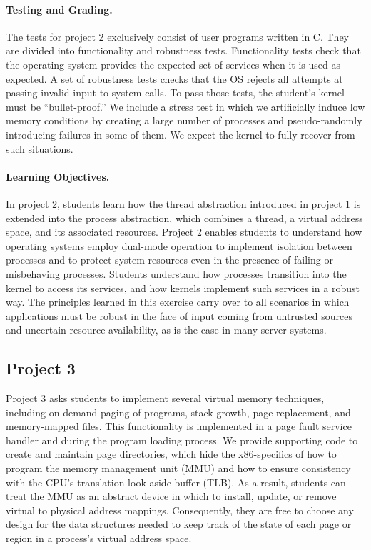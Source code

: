 \paragraph{Testing and Grading.}
The tests for project 2 exclusively consist of user programs written in C.
They are divided into functionality and robustness tests.  Functionality tests check that
the operating system provides the expected set of services when it is used as
expected.  A set of robustness tests checks that the OS rejects all attempts at passing
invalid input to system calls.  To pass those tests, the student's kernel must be 
``bullet-proof.'' We include a stress test in which we artificially induce low memory
conditions by creating a large number of processes and pseudo-randomly introducing
failures in some of them.  We expect the kernel to fully recover from such situations.

\paragraph{Learning Objectives.}
In project 2, students learn how the thread abstraction introduced in project 1 is 
extended into the process abstraction, which combines a thread, a virtual address space, 
and its associated resources.
Project 2 enables students to understand how operating systems employ dual-mode
operation to implement isolation between processes and to protect system resources
even in the presence of failing or misbehaving processes.  
Students understand how processes transition into the kernel to access its services,
and how kernels implement such services in a robust way.
The principles learned in this exercise carry over to all scenarios
in which applications must be robust in the face of input coming from untrusted 
sources and uncertain resource availability, as is the case in many server systems.

\subsection{Project 3}
Project 3 asks students to implement several virtual memory techniques, including
on-demand paging of programs, stack growth, page replacement, and memory-mapped files.
This functionality is implemented in a page fault service handler and during the
program loading process.
We provide supporting code to create and maintain page directories, which hide
the x86-specifics of how to program the memory management unit (MMU) and how
to ensure consistency with the CPU's translation look-aside buffer (TLB).  
As a result, students can treat the MMU as an abstract device in which to 
install, update, or remove virtual to physical address mappings.
Consequently, they are free to choose any design for the data structures needed to
keep track of the state of each page or region in a process's virtual address 
space.

